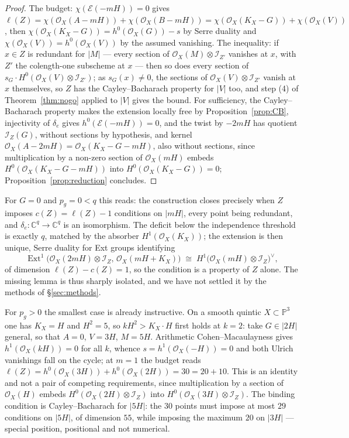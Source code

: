 \documentclass[10pt,a4paper]{amsart}
\newcommand{\OO}{\mathcal{O}}
\newcommand{\EE}{\mathcal{E}}
\newcommand{\II}{\mathcal{I}}
\newcommand{\CC}{\mathbb{C}}
\newcommand{\PP}{\mathbb{P}}
\newcommand{\Ext}{\operatorname{Ext}}
\newcommand{\len}{\ell}
\begin{document}
\begin{proof}
The budget: $\chi(\EE(-mH))=0$ gives $\len(Z)=\chi(\OO_X(A-mH))+\chi(\OO_X(B-mH))=\chi(\OO_X(K_X-G))+\chi(\OO_X(V))$, then $\chi(\OO_X(K_X-G))=h^0(\OO_X(G))-s$ by Serre duality and $\chi(\OO_X(V))=h^0(\OO_X(V))$ by the assumed vanishing. The inequality: if $x\in Z$ is redundant for $|M|$ --- every section of $\OO_X(M)\otimes\II_{Z'}$ vanishes at $x$, with $Z'$ the colength-one subscheme at $x$ --- then so does every section of $s_G\cdot H^0(\OO_X(V)\otimes\II_{Z'})$; as $s_G(x)\neq0$, the sections of $\OO_X(V)\otimes\II_{Z'}$ vanish at $x$ themselves, so $Z$ has the Cayley--Bacharach property for $|V|$ too, and step (4) of Theorem~\ref{thm:nogo} applied to $|V|$ gives the bound. For sufficiency, the Cayley--Bacharach property makes the extension locally free by Proposition~\ref{prop:CB}, injectivity of $\delta_e$ gives $h^0(\EE(-mH))=0$, and the twist by $-2mH$ has quotient $\II_Z(G)$, without sections by hypothesis, and kernel $\OO_X(A-2mH)=\OO_X(K_X-G-mH)$, also without sections, since multiplication by a non-zero section of $\OO_X(mH)$ embeds $H^0(\OO_X(K_X-G-mH))$ into $H^0(\OO_X(K_X-G))=0$; Proposition~\ref{prop:reduction} concludes.
\end{proof}

For $G=0$ and $p_g=0<q$ this reads: the construction closes precisely when $Z$ imposes $c(Z)=\len(Z)-1$ conditions on $|mH|$, every point being redundant, and $\delta_e:\CC^q\to\CC^q$ is an isomorphism. The deficit below the independence threshold is exactly $q$, matched by the absorber $H^1(\OO_X(K_X))$; the extension is then unique, Serre duality for Ext groups identifying
\[
\Ext^1\bigl(\OO_X(2mH)\otimes\II_Z,\,\OO_X(mH+K_X)\bigr)\;\cong\;H^1\bigl(\OO_X(mH)\otimes\II_Z\bigr)^\vee ,
\]
of dimension $\len(Z)-c(Z)=1$, so the condition is a property of $Z$ alone. The missing lemma is thus sharply isolated, and we have not settled it by the methods of \S\ref{sec:methods}.

For $p_g>0$ the smallest case is already instructive. On a smooth quintic $X\subset\PP^3$ one has $K_X=H$ and $H^2=5$, so $kH^2>K_X\cdot H$ first holds at $k=2$: take $G\in|2H|$ general, so that $A=0$, $V=3H$, $M=5H$. Arithmetic Cohen--Macaulayness gives $h^1(\OO_X(kH))=0$ for all $k$, whence $s=h^1(\OO_X(-H))=0$ and both Ulrich vanishings fall on the cycle; at $m=1$ the budget reads $\len(Z)=h^0(\OO_X(3H))+h^0(\OO_X(2H))=30=20+10$. This is an identity and not a pair of competing requirements, since multiplication by a section of $\OO_X(H)$ embeds $H^0(\OO_X(2H)\otimes\II_Z)$ into $H^0(\OO_X(3H)\otimes\II_Z)$. The binding condition is Cayley--Bacharach for $|5H|$: the $30$ points must impose at most $29$ conditions on $|5H|$, of dimension $55$, while imposing the maximum $20$ on $|3H|$ --- special position, positional and not numerical.
\end{document}
